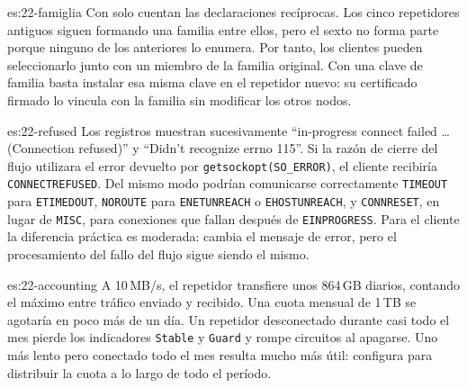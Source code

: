 \begin{soluzione}{es:22-famiglia}
Con  solo cuentan las declaraciones recíprocas. Los cinco repetidores antiguos siguen formando una familia entre ellos, pero el sexto no forma parte porque ninguno de los anteriores lo enumera. Por tanto, los clientes pueden seleccionarlo junto con un miembro de la familia original. Con una clave de familia basta instalar esa misma clave en el repetidor nuevo: su certificado firmado lo vincula con la familia sin modificar los otros nodos.
\end{soluzione}

\begin{soluzione}{es:22-refused}
Los registros muestran sucesivamente \enquote{in-progress connect failed \ldots (Connection refused)} y \enquote{Didn't recognize errno 115}. Si la razón de cierre del flujo utilizara el error devuelto por \texttt{getsockopt(SO\_ERROR)}, el cliente recibiría \texttt{CONNECTREFUSED}. Del mismo modo podrían comunicarse correctamente \texttt{TIMEOUT} para \texttt{ETIMEDOUT}, \texttt{NOROUTE} para \texttt{ENETUNREACH} o \texttt{EHOSTUNREACH}, y \texttt{CONNRESET}, en lugar de \texttt{MISC}, para conexiones que fallan después de \texttt{EINPROGRESS}. Para el cliente la diferencia práctica es moderada: cambia el mensaje de error, pero el procesamiento del fallo del flujo sigue siendo el mismo.
\end{soluzione}

\begin{soluzione}{es:22-accounting}
A 10\,MB/s, el repetidor transfiere unos 864\,GB diarios, contando el máximo entre tráfico enviado y recibido. Una cuota mensual de 1\,TB se agotaría en poco más de un día. Un repetidor desconectado durante casi todo el mes pierde los indicadores \texttt{Stable} y \texttt{Guard} y rompe circuitos al apagarse. Uno más lento pero conectado todo el mes resulta mucho más útil: configura  para distribuir la cuota a lo largo de todo el período.
\end{soluzione}
